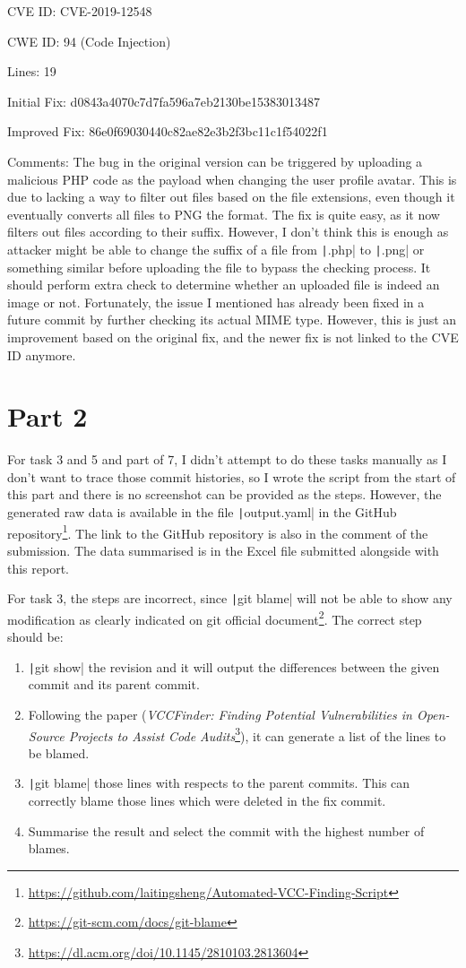 \documentclass[12pt]{article}
\begin{document}
CVE ID: CVE-2019-12548

CWE ID: 94 (Code Injection)

Lines: 19

Initial Fix: d0843a4070c7d7fa596a7eb2130be15383013487

Improved Fix: 86e0f69030440c82ae82e3b2f3bc11c1f54022f1

Comments: The bug in the original version can be triggered by uploading a malicious PHP code as the payload when changing the user profile avatar. This is due to lacking a way to filter out files based on the file extensions, even though it eventually converts all files to PNG the format. The fix is quite easy, as it now filters out files according to their suffix. However, I don't think this is enough as attacker might be able to change the suffix of a file from \texttt|.php| to \texttt|.png| or something similar before uploading the file to bypass the checking process. It should perform extra check to determine whether an uploaded file is indeed an image or not. Fortunately, the issue I mentioned has already been fixed in a future commit by further checking its actual MIME type. However, this is just an improvement based on the original fix, and the newer fix is not linked to the CVE ID anymore.

\section{Part 2}

For task 3 and 5 and part of 7, I didn't attempt to do these tasks manually as I don't want to trace those commit histories, so I wrote the script from the start of this part and there is no screenshot can be provided as the steps. However, the generated raw data is available in the file \texttt|output.yaml| in the GitHub repository\footnote{\url{https://github.com/laitingsheng/Automated-VCC-Finding-Script}}. The link to the GitHub repository is also in the comment of the submission. The data summarised is in the Excel file submitted alongside with this report.

For task 3, the steps are incorrect, since \texttt|git blame| will not be able to show any modification as clearly indicated on git official document\footnote{\url{https://git-scm.com/docs/git-blame}}. The correct step should be:
\begin{enumerate}
  \item \texttt|git show| the revision and it will output the differences between the given commit and its parent commit.
  \item Following the paper (\textit{VCCFinder: Finding Potential Vulnerabilities in Open-Source Projects to Assist Code Audits}\footnote{\url{https://dl.acm.org/doi/10.1145/2810103.2813604}}), it can generate a list of the lines to be blamed.
  \item \texttt|git blame| those lines with respects to the parent commits. This can correctly blame those lines which were deleted in the fix commit.
  \item Summarise the result and select the commit with the highest number of blames.
\end{enumerate}
\end{document}
